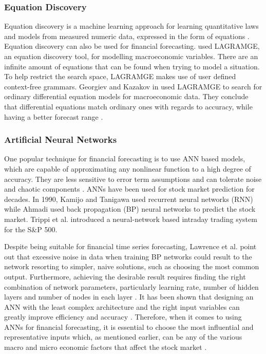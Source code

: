 \documentclass{UoYCSproject}
\begin{document}
\subsubsection{Equation Discovery}
Equation discovery is a machine learning approach for learning quantitative laws and models from measured numeric data, expressed in the form of equations \cite{Todorovski2010}. Equation discovery can also be used for financial forecasting.  \cite{kazakov2008equation}  used LAGRAMGE, an equation discovery tool, for modelling macroeconomic variables. There are an infinite amount of equations that can be found when trying to model a situation. To help restrict the search space, LAGRAMGE makes use of user defined context-free grammars. Georgiev and Kazakov in \cite{Georgiev2012Equation} used LAGRAMGE to search for ordinary differential equation models for macroeconomic data. They conclude that differential equations match ordinary ones with regards to accuracy, while having a better forecast range \cite{Kokov2012Equation}.  

\subsubsection{Artificial Neural Networks}
One popular technique for financial forecasting is to use ANN based models, which are capable of approximating any nonlinear function to a high degree of accuracy. They are less sensitive to error term assumptions and can tolerate noise and chaotic components \cite{majhi2007stock}. ANNs have been used for stock market prediction for decades. In 1990, Kamijo and Tanigawa \cite{kamijo1990stock} used recurrent neural networks (RNN) while Ahmadi \cite{ahmadi1990testability} used back propagation (BP) neural networks to predict the stock market. Trippi et al. \cite{trippi1992trading} introduced a neural-network based intraday trading system for the S\&P 500. 

Despite being suitable for financial time series forecasting, Lawrence et al. \cite{lawrence1998noisy} point out that excessive noise in data when training BP networks could result to the network resorting to simpler, naive solutions, such as choosing the most common output. Furthermore, achieving the desirable result requires finding the right combination of network parameters, particularly learning rate, number of hidden layers and number of nodes in each layer \cite{hussain2008financial}. It has been shown that designing an ANN with the least complex architecture and the right input variables can greatly improve efficiency and accuracy \cite{atsalakis2009surveying}. Therefore, when it comes to using ANNs for financial forecasting, it is essential to choose the most influential and representative inputs which, as mentioned earlier, can be any of the various macro and micro economic factors that affect the stock market \cite{zhong2017forecasting}. 
\end{document}
